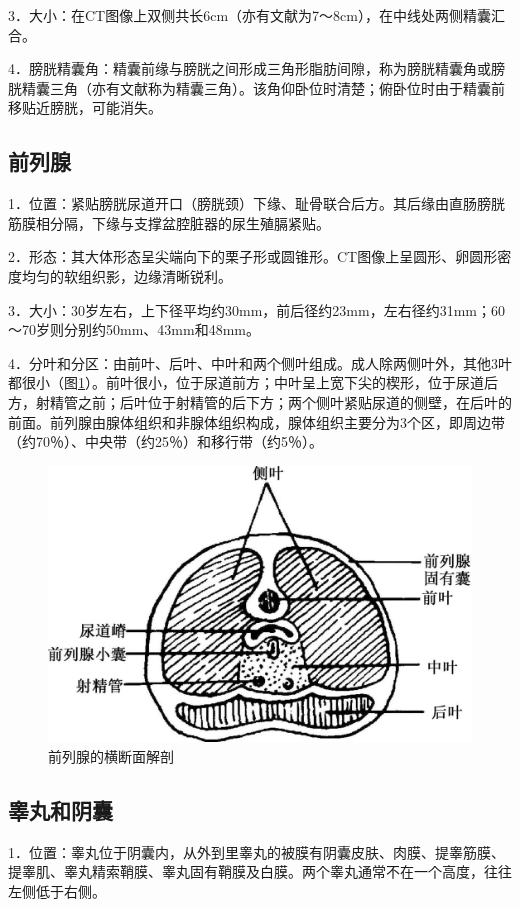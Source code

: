 3．大小：在CT图像上双侧共长6cm（亦有文献为7～8cm），在中线处两侧精囊汇合。

4．膀胱精囊角：精囊前缘与膀胱之间形成三角形脂肪间隙，称为膀胱精囊角或膀胱精囊三角（亦有文献称为精囊三角）。该角仰卧位时清楚；俯卧位时由于精囊前移贴近膀胱，可能消失。

\subsection{前列腺}

1．位置：紧贴膀胱尿道开口（膀胱颈）下缘、耻骨联合后方。其后缘由直肠膀胱筋膜相分隔，下缘与支撑盆腔脏器的尿生殖膈紧贴。

2．形态：其大体形态呈尖端向下的栗子形或圆锥形。CT图像上呈圆形、卵圆形密度均匀的软组织影，边缘清晰锐利。

3．大小：30岁左右，上下径平均约30mm，前后径约23mm，左右径约31mm；60～70岁则分别约50mm、43mm和48mm。

4．分叶和分区：由前叶、后叶、中叶和两个侧叶组成。成人除两侧叶外，其他3叶都很小（图\ref{fig21-1}）。前叶很小，位于尿道前方；中叶呈上宽下尖的楔形，位于尿道后方，射精管之前；后叶位于射精管的后下方；两个侧叶紧贴尿道的侧壁，在后叶的前面。前列腺由腺体组织和非腺体组织构成，腺体组织主要分为3个区，即周边带（约70％）、中央带（约25％）和移行带（约5％）。

\begin{figure}[!htbp]
 \centering
 \includegraphics[width=.7\textwidth,height=\textheight,keepaspectratio]{./images/Image00397.jpg}
 \captionsetup{justification=centering}
 \caption{前列腺的横断面解剖}
 \label{fig21-1}
  \end{figure} 

\subsection{睾丸和阴囊}

1．位置：睾丸位于阴囊内，从外到里睾丸的被膜有阴囊皮肤、肉膜、提睾筋膜、提睾肌、睾丸精索鞘膜、睾丸固有鞘膜及白膜。两个睾丸通常不在一个高度，往往左侧低于右侧。

